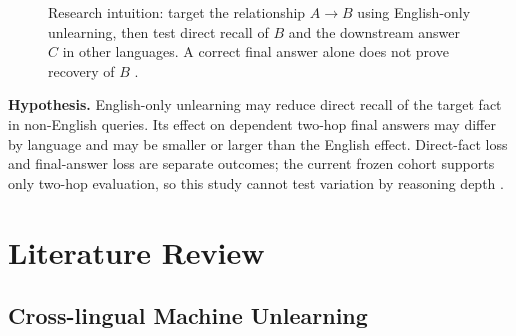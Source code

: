 \documentclass[10pt,a4paper]{article}
\begin{document}
\begin{figure}[htbp]
    \centering
{}
    \caption{Research intuition: target the relationship $A\!\rightarrow\!B$ using English-only unlearning, then test direct recall of $B$ and the downstream answer $C$ in other languages. A correct final answer alone does not prove recovery of $B$ \cite{yang2025socrates}.}
    \label{fig:multihop_unlearning}
\end{figure}

\textbf{Hypothesis.} English-only unlearning may reduce direct recall of the target fact in non-English queries. Its effect on dependent two-hop final answers may differ by language and may be smaller or larger than the English effect. Direct-fact loss and final-answer loss are separate outcomes; the current frozen cohort supports only two-hop evaluation, so this study cannot test variation by reasoning depth \cite{xiang2026multilingual,qian2026leak}.


\section{Literature Review}

\subsection{Cross-lingual Machine Unlearning}
\end{document}
